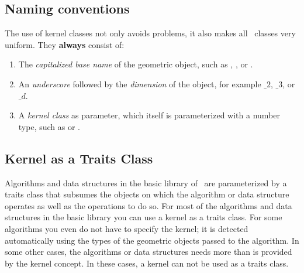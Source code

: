 \subsection{Naming conventions}

The use of kernel classes not only avoids problems, it also makes all
\cgal\ classes very uniform. They {\bf always} consist of:
\begin{enumerate}
\begin{ccTexOnly}
\itemsep0pt\parskip0pt
\end{ccTexOnly}

\item The {\em capitalized base name} of the geometric object, such as 
      , , or .

\item An {\em underscore} followed by the {\em dimension} of the object, 
      for example $\_2$, $\_3$, or $\_d$.
      
    \item A {\em kernel class} as parameter, which itself is
      parameterized with a number type, such as
       or
      .
\end{enumerate}

\subsection{Kernel as a Traits Class}
Algorithms and data structures in the basic library of \cgal\ are
parameterized by a traits class that subsumes the objects on which the
algorithm or data structure operates as well as the operations to do
so. For most of the algorithms and data structures in the basic
library you can use a kernel as a traits class. For some algorithms
you even do not have to specify the kernel; it is detected
automatically using the types of the geometric objects passed to the
algorithm. In some other cases, the algorithms or data structures
needs more than is provided by the kernel concept. In these cases, a
kernel can not be used as a traits class.

